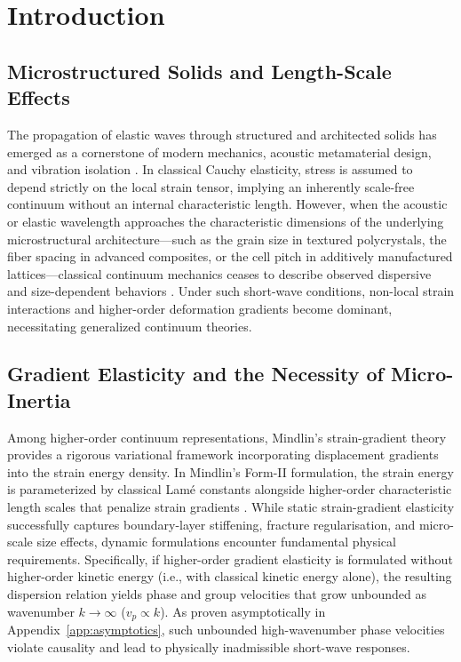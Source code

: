 \section{Introduction}
\label{sec:intro}

\subsection{Microstructured Solids and Length-Scale Effects}
The propagation of elastic waves through structured and architected solids has emerged as a cornerstone of modern mechanics, acoustic metamaterial design, and vibration isolation \cite{kushwaha1993}. In classical Cauchy elasticity, stress is assumed to depend strictly on the local strain tensor, implying an inherently scale-free continuum without an internal characteristic length. However, when the acoustic or elastic wavelength approaches the characteristic dimensions of the underlying microstructural architecture---such as the grain size in textured polycrystals, the fiber spacing in advanced composites, or the cell pitch in additively manufactured lattices---classical continuum mechanics ceases to describe observed dispersive and size-dependent behaviors \cite{mindlin1964,toupin1962}. Under such short-wave conditions, non-local strain interactions and higher-order deformation gradients become dominant, necessitating generalized continuum theories.

\subsection{Gradient Elasticity and the Necessity of Micro-Inertia}
Among higher-order continuum representations, Mindlin's strain-gradient theory \cite{mindlin1964,mindlineshel1968} provides a rigorous variational framework incorporating displacement gradients into the strain energy density. In Mindlin's Form-II formulation, the strain energy is parameterized by classical Lam\'e constants alongside higher-order characteristic length scales that penalize strain gradients \cite{askesaifantis2011,polyzosfotiadis2012}. While static strain-gradient elasticity successfully captures boundary-layer stiffening, fracture regularisation, and micro-scale size effects, dynamic formulations encounter fundamental physical requirements. Specifically, if higher-order gradient elasticity is formulated without higher-order kinetic energy (i.e., with classical kinetic energy alone), the resulting dispersion relation yields phase and group velocities that grow unbounded as wavenumber $k \to \infty$ ($v_p \propto k$). As proven asymptotically in Appendix~\ref{app:asymptotics}, such unbounded high-wavenumber phase velocities violate causality and lead to physically inadmissible short-wave responses.

